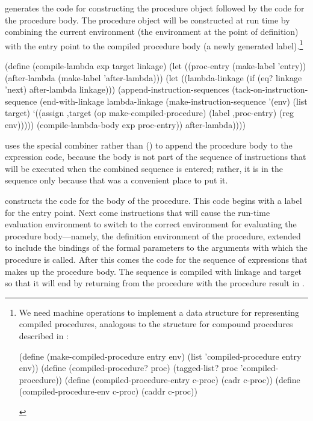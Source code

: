 \noindent
{} generates the code for constructing the procedure object
followed by the code for the procedure body.  The procedure object will be
constructed at run time by combining the current environment (the environment
at the point of definition) with the entry point to the compiled procedure body
(a newly generated label).\footnote{\label{Footnote 38} We need
machine operations to implement a data structure for representing compiled
procedures, analogous to the structure for compound procedures described in
:

\begin{compactCodeBlock}
(define (make-compiled-procedure entry env)
  (list 'compiled-procedure entry env))
(define (compiled-procedure? proc)
  (tagged-list? proc 'compiled-procedure))
(define (compiled-procedure-entry c-proc) (cadr c-proc))
(define (compiled-procedure-env c-proc) (caddr c-proc))
\end{compactCodeBlock}
}

\begin{codeBlock}
(define (compile-lambda exp target linkage)
  (let ((proc-entry (make-label 'entry))
        (after-lambda (make-label 'after-lambda)))
    (let ((lambda-linkage
            (if (eq? linkage 'next)
                after-lambda
                linkage)))
      (append-instruction-sequences
        (tack-on-instruction-sequence
          (end-with-linkage
            lambda-linkage
            (make-instruction-sequence
              '(env) (list target)
              `((assign ,target
                        (op make-compiled-procedure)
                        (label ,proc-entry)
                        (reg env)))))
          (compile-lambda-body exp proc-entry))
        after-lambda))))
\end{codeBlock}

\noindent
{} uses the special combiner
 rather than
 () to append the procedure body to the
 expression code, because the body is not part of the sequence of
instructions that will be executed when the combined sequence is entered;
rather, it is in the sequence only because that was a convenient place to put
it.

 constructs the code for the body of the procedure.
This code begins with a label for the entry point.  Next come instructions that
will cause the run-time evaluation environment to switch to the correct
environment for evaluating the procedure body---namely, the definition
environment of the procedure, extended to include the bindings of the formal
parameters to the arguments with which the procedure is called.  After this
comes the code for the sequence of expressions that makes up the procedure
body.  The sequence is compiled with linkage  and target
 so that it will end by returning from the procedure with the
procedure result in .

